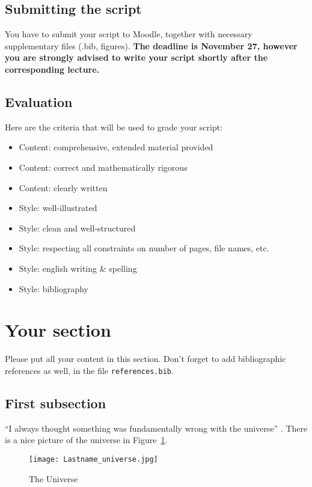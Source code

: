 \documentclass{article}
\begin{document}
\subsection{Submitting the script}

You have to submit your script to {\sc Moodle}, together with
necessary supplementary files (.bib, figures). {\bf The deadline is
November 27, however you are strongly advised to write your script
shortly after the corresponding lecture.} 

\subsection{Evaluation}

Here are the criteria that will be used to grade
your script:
\begin{itemize}
\setlength{\itemsep}{0mm}
\item Content: comprehensive, extended material provided
\item Content: correct and mathematically rigorous
\item Content: clearly written
\item Style: well-illustrated 
\item Style: clean and well-structured
\item Style: respecting all constraints on number of pages, file names, etc.
\item Style: english writing \& spelling
\item Style: bibliography
\end{itemize}
 

\section{Your section}\label{yourSection}

Please put all your content in this section. Don't
forget to add bibliographic references as well,
in the file \texttt{references.bib}.

\subsection{First subsection}

``I always thought something was fundamentally wrong with the universe'' \citep{adams1995hitchhiker}. 
There is a nice picture of the universe
in Figure~\ref{fig:universe}.

\begin{figure}[h!]
\centering
\texttt{[image: Lastname\_universe.jpg]}
\caption{The Universe}
\label{fig:universe}
\end{figure}
\end{document}
